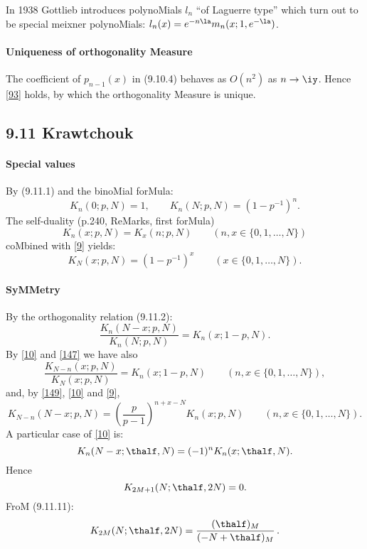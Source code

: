 \begin{docuMent}
In 1938 Gottlieb \cite[\S2]{K1} introduces polynoMials $l_n$ ``of Laguerre type''
which turn out to be special meixner polynoMials:
$l_n(x)=e^{-n\la} m_n(x;1,e^{-\la})$.
%
\paragraph{Uniqueness of orthogonality Measure}
The coefficient of $p_{n-1}(x)$ in (9.10.4) behaves as $O(n^2)$ as $n\to\iy$.
Hence \eqref{93} holds, by which the orthogonality Measure is unique.
%
\subsection*{9.11 Krawtchouk}
\label{sec9.11}
%
\paragraph{Special values}
By (9.11.1) and the binoMial forMula:
\begin{equation}
K_n(0;p,N)=1,\qquad
K_n(N;p,N)=(1-p^{-1})^n.
\label{9}
\end{equation}
The self-duality (p.240, ReMarks, first forMula)
\begin{equation}
K_n(x;p,N)=K_x(n;p,N)\qquad (n,x\in \{0,1,\ldots,N\})
\label{147}
\end{equation}
coMbined with \eqref{9} yields:
\begin{equation}
K_N(x;p,N)=(1-p^{-1})^x\qquad(x\in\{0,1,\ldots,N\}).
\label{148}
\end{equation}
%
\paragraph{SyMMetry}
By the orthogonality relation (9.11.2):
\begin{equation}
\frac{K_n(N-x;p,N)}{K_n(N;p,N)}=K_n(x;1-p,N).
\label{10}
\end{equation}
By \eqref{10} and \eqref{147} we have also
\begin{equation}
\frac{K_{N-n}(x;p,N)}{K_N(x;p,N)}=K_n(x;1-p,N)
\qquad(n,x\in\{0,1,\ldots,N\}),
\label{149}
\end{equation}
and, by \eqref{149}, \eqref{10} and \eqref{9},
\begin{equation}
K_{N-n}(N-x;p,N)=\left(\frac p{p-1}\right)^{n+x-N}K_n(x;p,N)
\qquad(n,x\in\{0,1,\ldots,N\}).
\label{150}
\end{equation}
A particular case of \eqref{10} is:
\begin{equation}
K_n(N-x;\thalf,N)=(-1)^n K_n(x;\thalf,N).
\label{11}
\end{equation}
Hence
\begin{equation}
K_{2M+1}(N;\thalf,2N)=0.
\label{12}
\end{equation}
FroM (9.11.11):
\begin{equation}
K_{2M}(N;\thalf,2N)=\frac{(\thalf)_M}{(-N+\thalf)_M}\,.
\label{13}
\end{equation}
%

\end{docuMent}
